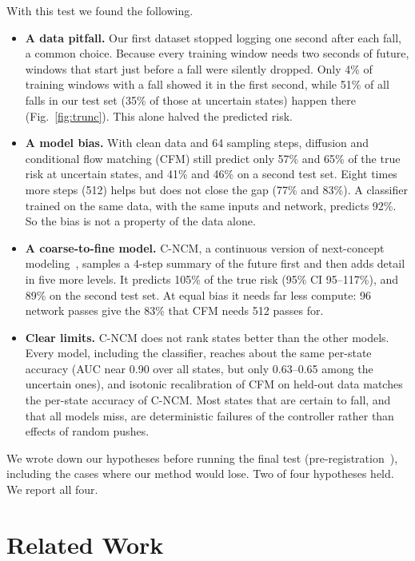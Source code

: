 \documentclass[conference]{IEEEtran}
\newcommand{\cncm}{C-NCM}
\begin{document}
With this test we found the following.
\begin{itemize}
  \item \textbf{A data pitfall.} Our first dataset stopped logging one second after each
    fall, a common choice. Because every training window needs two seconds of future,
    windows that start just before a fall were silently dropped. Only 4\% of training
    windows with a fall showed it in the first second, while 51\% of all falls in our test
    set (35\% of those at uncertain states) happen there (Fig.~\ref{fig:trunc}). This
    alone halved the predicted risk.
  \item \textbf{A model bias.} With clean data and 64 sampling steps, diffusion and
    conditional flow matching (CFM) still predict only 57\% and 65\% of the true risk at
    uncertain states, and 41\% and 46\% on a second test set. Eight times more steps (512)
    helps but does not close the gap (77\% and 83\%). A classifier trained on the same
    data, with the same inputs and network, predicts 92\%. So the bias is not a property
    of the data alone.
  \item \textbf{A coarse-to-fine model.} \cncm{}, a continuous version of next-concept
    modeling~\cite{kumbong2026ncm}, samples a 4-step summary of the future first and then
    adds detail in five more levels. It predicts 105\% of the true risk (95\% CI
    95--117\%), and 89\% on the second test set. At equal bias it needs far less compute:
    96 network passes give the 83\% that CFM needs 512 passes for.
  \item \textbf{Clear limits.} \cncm{} does not rank states better than the other
    models. Every model, including the classifier, reaches about the same per-state
    accuracy (AUC near 0.90 over all states, but only 0.63--0.65 among the uncertain
    ones), and isotonic recalibration of CFM on held-out data matches the per-state
    accuracy of \cncm{}. Most states that are certain to fall, and that all models miss,
    are deterministic failures of the controller rather than effects of random pushes.
\end{itemize}
We wrote down our hypotheses before running the final test
(pre-registration~\cite{nosek2018prereg}), including the cases where our method would lose.
Two of four hypotheses held. We report all four.

\section{Related Work}
\end{document}
